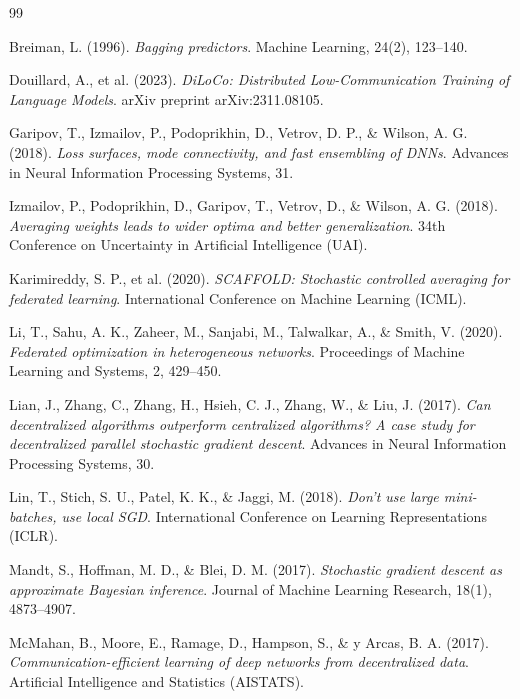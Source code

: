\documentclass[11pt]{article}
\begin{document}
\begin{thebibliography}{99}

Breiman, L. (1996). 
\textit{Bagging predictors}. 
Machine Learning, 24(2), 123--140.

Douillard, A., et al. (2023). 
\textit{DiLoCo: Distributed Low-Communication Training of Language Models}. 
arXiv preprint arXiv:2311.08105.

Garipov, T., Izmailov, P., Podoprikhin, D., Vetrov, D. P., \& Wilson, A. G. (2018). 
\textit{Loss surfaces, mode connectivity, and fast ensembling of DNNs}. 
Advances in Neural Information Processing Systems, 31.

Izmailov, P., Podoprikhin, D., Garipov, T., Vetrov, D., \& Wilson, A. G. (2018). 
\textit{Averaging weights leads to wider optima and better generalization}. 
34th Conference on Uncertainty in Artificial Intelligence (UAI).

Karimireddy, S. P., et al. (2020). 
\textit{SCAFFOLD: Stochastic controlled averaging for federated learning}. 
International Conference on Machine Learning (ICML).

Li, T., Sahu, A. K., Zaheer, M., Sanjabi, M., Talwalkar, A., \& Smith, V. (2020). 
\textit{Federated optimization in heterogeneous networks}. 
Proceedings of Machine Learning and Systems, 2, 429--450.

Lian, J., Zhang, C., Zhang, H., Hsieh, C. J., Zhang, W., \& Liu, J. (2017). 
\textit{Can decentralized algorithms outperform centralized algorithms? A case study for decentralized parallel stochastic gradient descent}. 
Advances in Neural Information Processing Systems, 30.

Lin, T., Stich, S. U., Patel, K. K., \& Jaggi, M. (2018). 
\textit{Don't use large mini-batches, use local SGD}. 
International Conference on Learning Representations (ICLR).

Mandt, S., Hoffman, M. D., \& Blei, D. M. (2017). 
\textit{Stochastic gradient descent as approximate Bayesian inference}. 
Journal of Machine Learning Research, 18(1), 4873--4907.

McMahan, B., Moore, E., Ramage, D., Hampson, S., \& y Arcas, B. A. (2017). 
\textit{Communication-efficient learning of deep networks from decentralized data}. 
Artificial Intelligence and Statistics (AISTATS).


\end{thebibliography}
\end{document}
